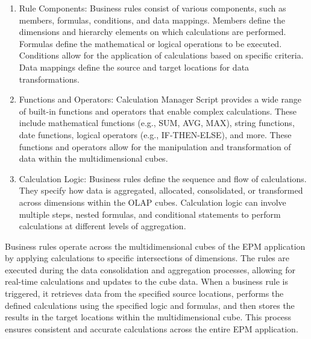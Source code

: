 \documentclass[12pt,a4paper,openright,twoside]{book}
\begin{document}
\begin{enumerate}
    \item Rule Components: Business rules consist of various components, such as members, formulas, conditions, and data mappings. Members define the dimensions and hierarchy elements on which calculations are performed. Formulas define the mathematical or logical operations to be executed. Conditions allow for the application of calculations based on specific criteria. Data mappings define the source and target locations for data transformations.
    \item Functions and Operators: Calculation Manager Script provides a wide range of built-in functions and operators that enable complex calculations. These include mathematical functions (e.g., SUM, AVG, MAX), string functions, date functions, logical operators (e.g., IF-THEN-ELSE), and more. These functions and operators allow for the manipulation and transformation of data within the multidimensional cubes.
    \item Calculation Logic: Business rules define the sequence and flow of calculations. They specify how data is aggregated, allocated, consolidated, or transformed across dimensions within the OLAP cubes. Calculation logic can involve multiple steps, nested formulas, and conditional statements to perform calculations at different levels of aggregation.
\end{enumerate}

Business rules operate across the multidimensional cubes of the EPM application by applying calculations to specific intersections of dimensions. 
%
The rules are executed during the data consolidation and aggregation processes, allowing for real-time calculations and updates to the cube data.
%
When a business rule is triggered, it retrieves data from the specified source locations, performs the defined calculations using the specified logic and formulas, and then stores the results in the target locations within the multidimensional cube. 
%
This process ensures consistent and accurate calculations across the entire EPM application.

\chapter{\conclusionsname}
\label{chap:conclusions}
\end{document}
